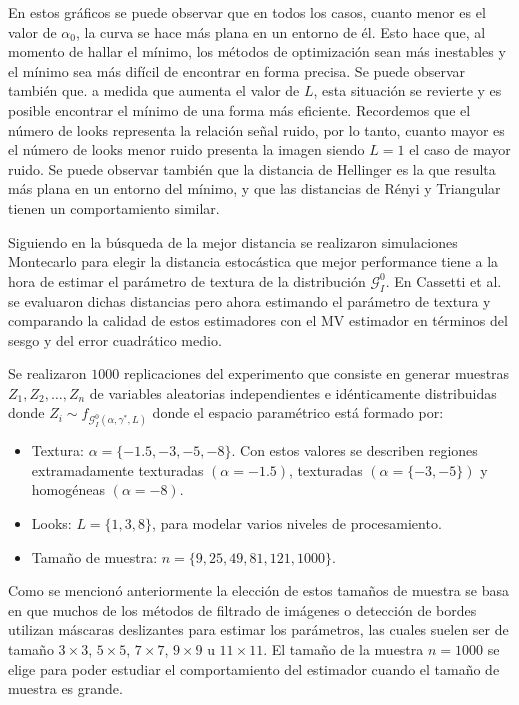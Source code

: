 En estos gráficos se puede observar que en todos los casos, cuanto menor es el valor de $\alpha_0$, la curva se hace más plana en un entorno  de él. Esto hace que, al momento de hallar el mínimo, los métodos de optimización sean más inestables y el mínimo sea más difícil de encontrar en forma precisa. Se puede observar también que. a medida que aumenta el valor de $L$, esta situación se revierte y es posible encontrar el mínimo de una forma más eficiente. Recordemos que el número de looks representa la relación señal ruido, por lo tanto, cuanto mayor es el número de looks menor ruido presenta la imagen siendo $L=1$ el caso de mayor ruido. Se puede observar también que la distancia de Hellinger es la que resulta más plana en un entorno del mínimo, y que las distancias de Rényi y Triangular tienen un comportamiento similar.

Siguiendo en la búsqueda de la mejor distancia se realizaron simulaciones Montecarlo para elegir la distancia estocástica que mejor performance tiene a la hora de estimar el parámetro de textura de la distribución $\mathcal{G}_I^0$. En Cassetti et al.~\cite{cassettiast2013} se evaluaron dichas distancias pero ahora estimando el parámetro de textura y  comparando la calidad de estos estimadores con el MV estimador en términos del sesgo y del error cuadrático medio. 

Se realizaron $1000$ replicaciones del experimento que consiste en generar muestras $Z_1, Z_2,\ldots,Z_n$ de variables aleatorias independientes e idénticamente distribuidas donde $Z_i \sim f_{\mathcal{G}_I^0(\alpha,\gamma^*,L)}$ donde el espacio paramétrico está formado por:

\begin{itemize}
	\item Textura: $\alpha=\{-1.5, -3, -5, -8\}$. Con estos valores se describen regiones extramadamente texturadas $(\alpha=-1.5)$, texturadas $(\alpha=\{-3,-5\})$ y homogéneas $(\alpha=-8)$. 
	\item Looks: $L=\{1,3,8\}$, para modelar varios niveles de procesamiento.
	\item Tamaño de muestra: $n=\{9, 25,49, 81,121,1000\}$. 
\end{itemize}

Como se mencionó anteriormente la elección de estos tamaños de muestra se basa en que muchos de los métodos de filtrado de imágenes o detección de bordes utilizan máscaras deslizantes para estimar los parámetros, las cuales suelen ser de tamaño $3 \times 3$,  $5 \times 5$, $7 \times 7$, $9 \times 9$ u  $11 \times 11$. El tamaño de la muestra $n=1000$ se elige para poder estudiar el comportamiento del estimador cuando el tamaño de muestra es grande. 

